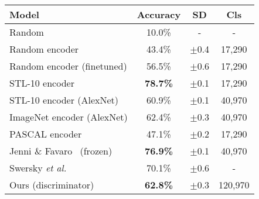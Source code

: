 \documentclass[a4paper,12pt]{report}
\begin{document}
\begin{table}[ht!]
\centering
\begin{tabular}{l c c|c}
\Xhline{0.8pt}
\textbf{Model} & \textbf{Accuracy} & \textbf{SD} & \textbf{Cls}\\
\hline
Random & 10.0\% & - & - \\
Random encoder & 43.4\% & $\pm$0.4 & 17,290 \\ %
Random encoder (finetuned) & 56.5\% & $\pm$0.6 & 17,290 \\ %
\hline
STL-10 encoder & \textbf{78.7\%} & $\pm$0.1 & 17,290 \\ %
STL-10 encoder (AlexNet) & 60.9\% & $\pm$0.1 & 40,970 \\ %
ImageNet encoder (AlexNet) & 62.4\% & $\pm$0.3 & 40,970 \\ %
PASCAL encoder & 47.1\% & $\pm$0.2 & 17,290 \\ %
\hline
Jenni \& Favaro~\cite{SpotArtifacts} (frozen) & \textbf{76.9\%} & $\pm$0.1 & 40,970 \\
Swersky \textit{et al.}~\cite{Stl10TlExp2Comp} & 70.1\% & $\pm$0.6 & - \\
\hline
Ours (discriminator) & \textbf{62.8\%}  & $\pm$0.3 & 120,970 \\ %

\end{tabular}
\end{table}
\end{document}
